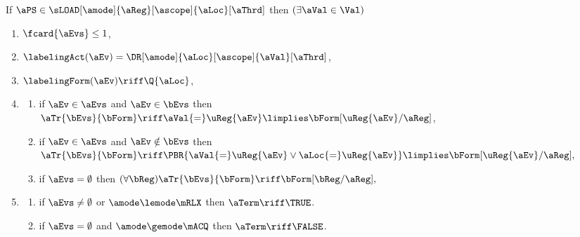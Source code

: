 \begin{figure}
  \noindent
  If $\aPS \in \sLOAD[\amode]{\aReg}[\ascope]{\aLoc}[\aThrd]$ then
  $(\exists\aVal\in\Val)$
  \begin{multicols}{2}
    \begin{enumerate}[topsep=0pt,label=(\textsc{r}\arabic*),ref=\textsc{r}\arabic*]
    \item \label{read-E}
      $\fcard{\aEvs}\leq1$,
    \item \label{read-lambda}
      $\labelingAct(\aEv) = \DR[\amode]{\aLoc}[\ascope]{\aVal}[\aThrd]$,      
    \item \label{read-kappa}
      $\labelingForm(\aEv) \riff \Q{\aLoc}$,
    \item[] \setcounter{enumi}{\value{tau}} 
      \begin{enumerate}[leftmargin=0pt]
      \item \label{read-tau-dep}
        if $\aEv\in\aEvs$ and $\aEv\in\bEvs$ then
        \begin{math}
          \aTr{\bEvs}{\bForm} \riff
          \aVal{=}\uReg{\aEv}
          \limplies \bForm[\uReg{\aEv}/\aReg]
        \end{math},    
      \item \label{read-tau-ind}
        if $\aEv\in\aEvs$ and $\aEv\notin\bEvs$ then
        \begin{math}
          \aTr{\bEvs}{\bForm} \riff
          \PBR{\aVal{=}\uReg{\aEv} \lor \aLoc{=}\uReg{\aEv}} \limplies
          \bForm[\uReg{\aEv}/\aReg],
        \end{math}
      \item \label{read-tau-empty}
        if $\aEvs=\emptyset$ then
        \begin{math}
          (\forall\bReg)
          \aTr{\bEvs}{\bForm} \riff
          \bForm[\bReg/\aReg],
        \end{math}
      \end{enumerate}
    \item[] 
      \begin{enumerate}[leftmargin=0pt]
      \item \label{read-term-nonempty}
        if $\aEvs\neq\emptyset$ or $\amode\lemode\mRLX$ then $\aTerm \riff \TRUE$. 
      \item \label{read-term-empty}
        if $\aEvs=\emptyset$ and $\amode\gemode\mACQ$ then $\aTerm \riff \FALSE$. 
      \end{enumerate}      
    \end{enumerate}
  \end{multicols}
  \medskip


\end{figure}
